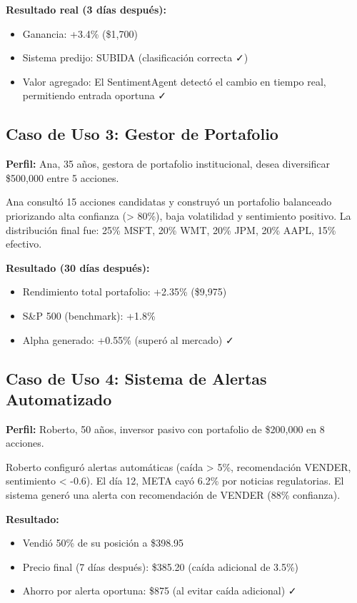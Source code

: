 \textbf{Resultado real (3 días después):}
\begin{itemize}
    \item Ganancia: +3.4\% (\$1,700)
    \item Sistema predijo: SUBIDA (clasificación correcta ✓)
    \item Valor agregado: El SentimentAgent detectó el cambio en tiempo real, permitiendo entrada oportuna ✓
\end{itemize}

\subsection{Caso de Uso 3: Gestor de Portafolio}

\textbf{Perfil:} Ana, 35 años, gestora de portafolio institucional, desea diversificar \$500,000 entre 5 acciones.

Ana consultó 15 acciones candidatas y construyó un portafolio balanceado priorizando alta confianza (> 80\%), baja volatilidad y sentimiento positivo. La distribución final fue: 25\% MSFT, 20\% WMT, 20\% JPM, 20\% AAPL, 15\% efectivo.

\textbf{Resultado (30 días después):}
\begin{itemize}
    \item Rendimiento total portafolio: +2.35\% (\$9,975)
    \item S\&P 500 (benchmark): +1.8\%
    \item Alpha generado: +0.55\% (superó al mercado) ✓
\end{itemize}

\subsection{Caso de Uso 4: Sistema de Alertas Automatizado}

\textbf{Perfil:} Roberto, 50 años, inversor pasivo con portafolio de \$200,000 en 8 acciones.

Roberto configuró alertas automáticas (caída > 5\%, recomendación VENDER, sentimiento < -0.6). El día 12, META cayó 6.2\% por noticias regulatorias. El sistema generó una alerta con recomendación de VENDER (88\% confianza).

\textbf{Resultado:}
\begin{itemize}
    \item Vendió 50\% de su posición a \$398.95
    \item Precio final (7 días después): \$385.20 (caída adicional de 3.5\%)
    \item Ahorro por alerta oportuna: \$875 (al evitar caída adicional) ✓
\end{itemize}

